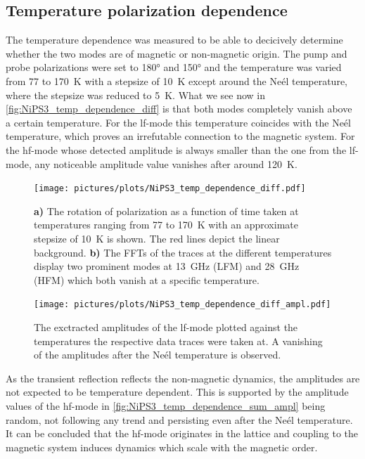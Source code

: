 \subsection{Temperature polarization dependence}
The temperature dependence was measured to be able to decicively determine whether the two modes are of magnetic or non-magnetic origin.
The pump and probe polarizations were set to 180° and 150° and the temperature was varied from 77 to \qty{170}{K} with a stepsize of \qty{10}{K} except around the Neél temperature, where the stepsize was reduced to \qty{5}{K}.
What we see now in \autoref{fig:NiPS3_temp_dependence_diff} is that both modes completely vanish above a certain temperature.
For the lf-mode this temperature coincides with the Neél temperature, which proves an irrefutable connection to the magnetic system.
For the hf-mode whose detected amplitude is always smaller than the one from the lf-mode, any noticeable amplitude value vanishes after around \qty{120}{K}.
\begin{figure}[hbt!]
    \centering
    \texttt{[image: pictures/plots/NiPS3\_temp\_dependence\_diff.pdf]} \vspace{-0.3cm}
    \caption{\textbf{a)} The rotation of polarization as a function of time taken at temperatures ranging from 77 to \qty{170}{K} with an approximate stepsize of \qty{10}{K} is shown. The red lines depict the linear background. \textbf{b)} The FFTs of the traces at the different temperatures display two prominent modes at \qty{13}{GHz} (LFM) and \qty{28}{GHz} (HFM) which both vanish at a specific temperature.}
    \label{fig:NiPS3_temp_dependence_diff}
\end{figure}
\begin{figure}[hbt!]
    \centering  
    \texttt{[image: pictures/plots/NiPS3\_temp\_dependence\_diff\_ampl.pdf]} \vspace{-0.3cm}
    \caption{The exctracted amplitudes of the lf-mode plotted against the temperatures the respective data traces were taken at. A vanishing of the amplitudes after the Neél temperature is observed.}
    \label{fig:NiPS3_temp_dependence_diff_ampl}
\end{figure}
\FloatBarrier
As the transient reflection reflects the non-magnetic dynamics, the amplitudes are not expected to be temperature dependent.
This is supported by the amplitude values of the hf-mode in \autoref{fig:NiPS3_temp_dependence_sum_ampl} being random, not following any trend and persisting even after the Neél temperature.
It can be concluded that the hf-mode originates in the lattice and coupling to the magnetic system induces dynamics which scale with the magnetic order.
